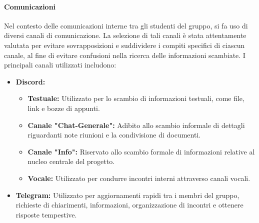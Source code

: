 \documentclass{article}
\begin{document}
\paragraph{Comunicazioni}
Nel contesto delle comunicazioni interne tra gli studenti del gruppo, si fa uso di diversi canali di comunicazione. La selezione di tali canali è stata attentamente valutata per evitare sovrapposizioni e suddividere i compiti specifici di ciascun canale, al fine di evitare confusioni nella ricerca delle informazioni scambiate. I principali canali utilizzati includono:
\begin{itemize}
    \item \textbf{Discord:}
        \begin{itemize}
            \item \textbf{Testuale:} Utilizzato per lo scambio di informazioni testuali, come file, link e bozze di appunti.
            \item \textbf{Canale "Chat-Generale":} Adibito allo scambio informale di dettagli riguardanti note riunioni e la condivisione di documenti.
            \item \textbf{Canale "Info":} Riservato allo scambio formale di informazioni relative al nucleo centrale del progetto.
            \item \textbf{Vocale: }Utilizzato per condurre incontri interni attraverso canali vocali.
        \end{itemize}
    \item \textbf{Telegram:}
Utilizzato per aggiornamenti rapidi tra i membri del gruppo, richieste di chiarimenti, informazioni, organizzazione di incontri e ottenere risposte tempestive.

\end{itemize}
\end{document}
